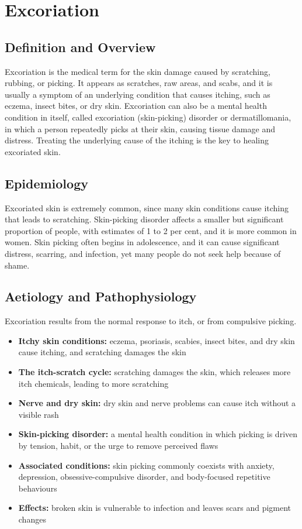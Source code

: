 \chapter{Excoriation}

\section*{Definition and Overview}
Excoriation is the medical term for the skin damage caused by scratching, rubbing, or picking. It appears as scratches, raw areas, and scabs, and it is usually a symptom of an underlying condition that causes itching, such as eczema, insect bites, or dry skin. Excoriation can also be a mental health condition in itself, called excoriation (skin-picking) disorder or dermatillomania, in which a person repeatedly picks at their skin, causing tissue damage and distress. Treating the underlying cause of the itching is the key to healing excoriated skin.

\section*{Epidemiology}
Excoriated skin is extremely common, since many skin conditions cause itching that leads to scratching. Skin-picking disorder affects a smaller but significant proportion of people, with estimates of 1 to 2 per cent, and it is more common in women. Skin picking often begins in adolescence, and it can cause significant distress, scarring, and infection, yet many people do not seek help because of shame.

\section*{Aetiology and Pathophysiology}
Excoriation results from the normal response to itch, or from compulsive picking.
\begin{itemize}
    \item \textbf{Itchy skin conditions:} eczema, psoriasis, scabies, insect bites, and dry skin cause itching, and scratching damages the skin
    \item \textbf{The itch-scratch cycle:} scratching damages the skin, which releases more itch chemicals, leading to more scratching
    \item \textbf{Nerve and dry skin:} dry skin and nerve problems can cause itch without a visible rash
    \item \textbf{Skin-picking disorder:} a mental health condition in which picking is driven by tension, habit, or the urge to remove perceived flaws
    \item \textbf{Associated conditions:} skin picking commonly coexists with anxiety, depression, obsessive-compulsive disorder, and body-focused repetitive behaviours
    \item \textbf{Effects:} broken skin is vulnerable to infection and leaves scars and pigment changes
\end{itemize}

